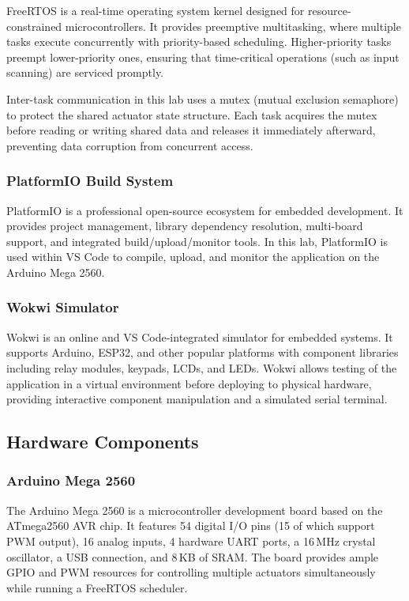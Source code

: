 FreeRTOS is a real-time operating system kernel designed for resource-constrained microcontrollers. It provides preemptive multitasking, where multiple tasks execute concurrently with priority-based scheduling. Higher-priority tasks preempt lower-priority ones, ensuring that time-critical operations (such as input scanning) are serviced promptly.

Inter-task communication in this lab uses a mutex (mutual exclusion semaphore) to protect the shared actuator state structure. Each task acquires the mutex before reading or writing shared data and releases it immediately afterward, preventing data corruption from concurrent access.

\subsubsection{PlatformIO Build System}

PlatformIO is a professional open-source ecosystem for embedded development. It provides project management, library dependency resolution, multi-board support, and integrated build/upload/monitor tools. In this lab, PlatformIO is used within VS Code to compile, upload, and monitor the application on the Arduino Mega 2560.

\subsubsection{Wokwi Simulator}

Wokwi is an online and VS Code-integrated simulator for embedded systems. It supports Arduino, ESP32, and other popular platforms with component libraries including relay modules, keypads, LCDs, and LEDs. Wokwi allows testing of the application in a virtual environment before deploying to physical hardware, providing interactive component manipulation and a simulated serial terminal.

\subsection{Hardware Components}

\subsubsection{Arduino Mega 2560}

The Arduino Mega 2560 is a microcontroller development board based on the ATmega2560 AVR chip. It features 54 digital I/O pins (15 of which support PWM output), 16 analog inputs, 4 hardware UART ports, a 16\,MHz crystal oscillator, a USB connection, and 8\,KB of SRAM. The board provides ample GPIO and PWM resources for controlling multiple actuators simultaneously while running a FreeRTOS scheduler.

